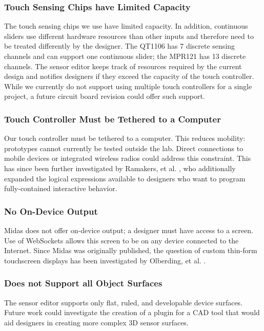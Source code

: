 \subsubsection{Touch Sensing Chips have Limited Capacity}
The touch sensing chips we use have limited capacity. In addition, continuous sliders use different hardware resources than other inputs and therefore need to be treated differently by the designer. The QT1106 has 7 discrete sensing channels and can support one continuous slider; the MPR121 has 13 discrete channels. The sensor editor keeps track of resources required by the current design and notifies designers if they exceed the capacity of the touch controller. While we currently do not support using multiple touch controllers for a single project, a future circuit board revision could offer such support. 

\subsubsection{Touch Controller Must be Tethered to a Computer}
Our touch controller must be tethered to a computer. This reduces mobility: prototypes cannot currently be tested outside the lab. Direct connections to mobile devices or integrated wireless radios could address this constraint. This has since been further investigated by Ramakers, et al. \cite{ramakers-paperpulse}, who additionally expanded the logical expressions available to designers who want to program fully-contained interactive behavior.

\subsubsection{No On-Device Output}
Midas does not offer on-device output; a designer must have access to a screen. Use of WebSockets allows this screen to be on any device connected to the Internet. Since Midas was originally published, the question of custom thin-form touchscreen displays has been investigated by Olberding, et al. \cite{olberding-printscreen}.

\subsubsection{Does not Support all Object Surfaces}
The sensor editor supports only flat, ruled, and developable device surfaces. Future work could investigate the creation of a plugin for a CAD tool that would aid designers in creating more complex 3D sensor surfaces.

